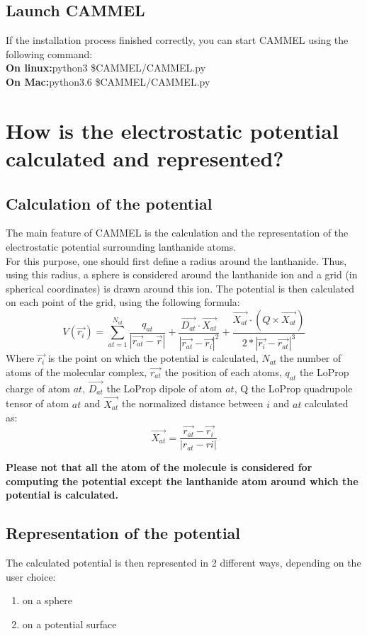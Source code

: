 \documentclass[12pt,a4paper]{article}
\begin{document}
\subsection{Launch CAMMEL}
If the installation process finished correctly, you can start CAMMEL using the following command:\\
\textbf{On linux:}python3 \$CAMMEL/CAMMEL.py \\
\textbf{On Mac:}python3.6 \$CAMMEL/CAMMEL.py


\section{How is the electrostatic potential calculated and represented?}
\subsection{Calculation of the potential}
The main feature of CAMMEL is the calculation and the representation of the electrostatic potential surrounding lanthanide atoms.\\

For this purpose, one should first define a radius around the lanthanide. Thus, using this radius, a sphere is considered around the lanthanide ion and a grid (in spherical coordinates) is drawn around this ion. The potential is then calculated on each point of the grid, using the following formula:
\begin{equation}
V(\vec{r_i})=\sum_{at=1}^{N_{at}} \frac{q_{at}}{|\vec{r_{at}}-\vec{r}|} + \frac{\vec{D_{at}}\cdot{}\vec{X_{at}}}{|\vec{r_{at}}-\vec{r_i}|^2} + \frac{\vec{X_{at}}\cdot{}(Q\times\vec{X_{at}})}{2*|\vec{r_i}-\vec{r_{at}}|^3}
\end{equation}
Where $\vec{r_i}$ is the point on which the potential  is calculated, $N_{at}$ the number of atoms of the molecular complex, $\vec{r_{at}}$ the position of each atoms, $q_{at}$ the LoProp charge of atom $at$, $\vec{D_{at}}$ the LoProp dipole of atom $at$, Q the LoProp quadrupole tensor of atom $at$ and $\vec{X_{at}}$ the normalized distance between $i$ and $at$ calculated as:
\begin{equation}
\vec{X_{at}}=\frac{\vec{r_{at}}-\vec{r_i}}{|r_{{at}}-r{i}|}
\end{equation}

\textbf{Please not that all the atom of the molecule is considered for computing the potential except the lanthanide atom around which the potential is calculated.}

\subsection{Representation of the potential}
The calculated potential is then represented in 2 different ways, depending on the user choice:
\begin{enumerate}
\item{on a sphere}
\item{on a \og potential surface \fg{} } 
\end{enumerate}
\end{document}
